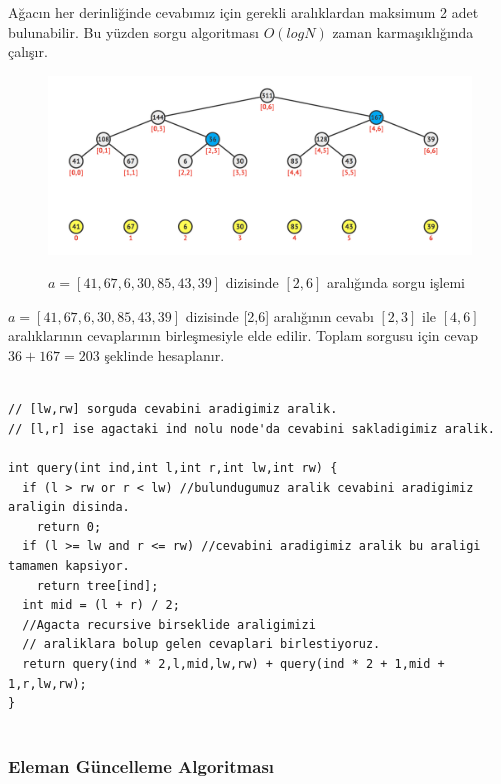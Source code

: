 \documentclass[12pt]{article}
\begin{document}
    A\u{g}ac{\i}n her derinli\u{g}inde cevab{\i}m{\i}z i\c{c}in gerekli aral{\i}klardan maksimum 2
    adet bulunabilir. Bu y\"{u}zden sorgu algoritmas{\i} $O(logN)$ zaman karma\c{s}{\i}kl{\i}\u{g}{\i}nda \c{c}al{\i}\c{s}{\i}r.

    
    \clearpage
    
	\begin{figure}[h]
		\centering
		\includegraphics[width=\linewidth/1]{segtreequery.png}
		\label{fig:segtreequery}
        \caption{$a = [41,67,6,30,85,43,39]$ dizisinde $[2,6]$ aral{\i}\u{g}{\i}nda sorgu i\c{s}lemi}
	\end{figure}

    $a = [41,67,6,30,85,43,39]$ dizisinde [2,6] aral{\i}\u{g}{\i}n{\i}n cevab{\i} $[2,3]$ ile $[4,6]$ aral{\i}klar{\i}n{\i}n cevaplar{\i}n{\i}n birle\c{s}mesiyle elde edilir. Toplam sorgusu i\c{c}in cevap $36+167=203$ \c{s}eklinde hesaplan{\i}r.
    
    \begin{verbatim}

// [lw,rw] sorguda cevabini aradigimiz aralik.
// [l,r] ise agactaki ind nolu node'da cevabini sakladigimiz aralik.

int query(int ind,int l,int r,int lw,int rw) { 
  if (l > rw or r < lw) //bulundugumuz aralik cevabini aradigimiz araligin disinda.
    return 0;
  if (l >= lw and r <= rw) //cevabini aradigimiz aralik bu araligi tamamen kapsiyor.
    return tree[ind];
  int mid = (l + r) / 2;
  //Agacta recursive birseklide araligimizi
  // araliklara bolup gelen cevaplari birlestiyoruz.  
  return query(ind * 2,l,mid,lw,rw) + query(ind * 2 + 1,mid + 1,r,lw,rw);
}
    
    \end{verbatim}    
    
    \subsubsection{Eleman G\"{u}ncelleme Algoritmas{\i}}
    
\end{document}
